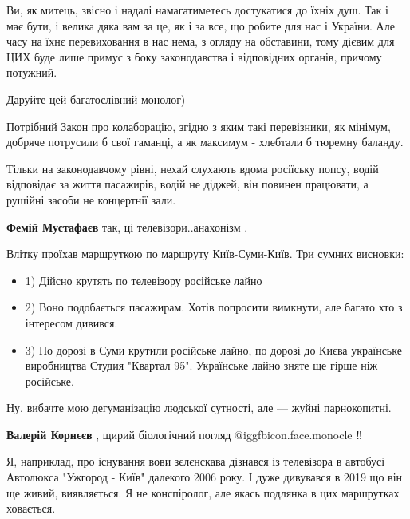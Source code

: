\begin{itemize}
Ви, як митець, звісно і надалі намагатиметесь достукатися до їхніх душ. Так і
має бути, і велика дяка вам за це, як і за все, що робите для нас і України.
Але часу на їхнє перевиховання в нас нема, з огляду на обставини, тому дієвим
для ЦИХ буде лише примус з боку законодавства і відповідних органів, причому
потужний.

Даруйте цей багатослівний монолог)



Потрібний Закон про колаборацію, згідно з яким такі перевізники, як мінімум,
добряче потрусили б свої гаманці, а як максимум - хлебтали б тюремну баланду.



Тільки на законодавчому рівні, нехай слухають вдома росіїську попсу, водій
відповідає за життя пасажирів, водій не діджей, він повинен працювати, а
рушійні засоби не концертнії зали.

\begin{itemize} %
\textbf{Фемій Мустафаєв} так, ці телевізори..анахонізм .
\end{itemize} %


Влітку проїхав маршруткою по маршруту Київ-Суми-Київ. Три сумних висновки:

\begin{itemize} %

\item 1) Дійсно крутять по телевізору російське лайно

\item 2) Воно подобається пасажирам. Хотів попросити вимкнути, але багато хто з
інтересом дивився.

\item 3) По дорозі в Суми крутили російське лайно, по дорозі до Києва українське
виробництва Студия "Квартал 95". Українське лайно зняте ще гірше ніж російське.

\end{itemize} %


Ну, вибачте мою дегуманізацію людської сутності, але — жуйні парнокопитні.

\textbf{Валерій Корнєєв} , щирий біологічний погляд @igg{fbicon.face.monocle}  ‼ ️ 


Я, наприклад, про існування вови зєлєнскава дізнався із телевізора в автобусі
Автолюкса "Ужгород - Київ" далекого 2006 року. І дуже дивувався в 2019 що він
ще живий, виявляється. Я не конспіролог, але якась подлянка в цих маршрутках
ховається.



\end{itemize}
